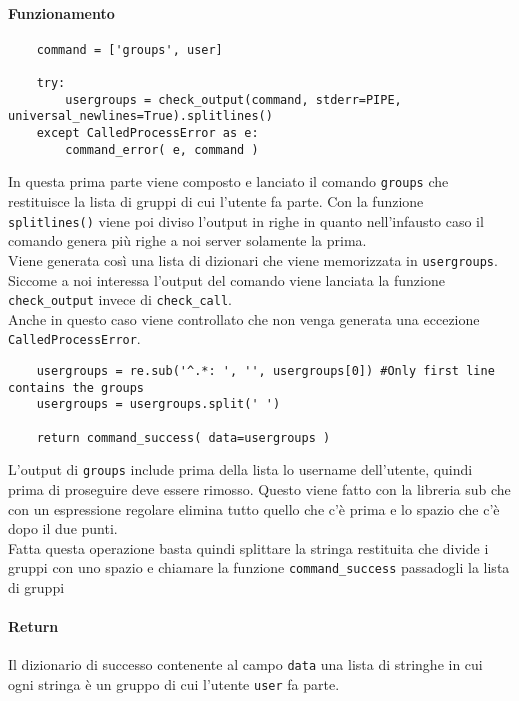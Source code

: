 \documentclass[11pt]{article}
\begin{document}
\paragraph{Funzionamento}
\begin{lstlisting}
    command = ['groups', user]
    
    try:
        usergroups = check_output(command, stderr=PIPE, universal_newlines=True).splitlines()
    except CalledProcessError as e:
        command_error( e, command )
\end{lstlisting}
In questa prima parte viene composto e lanciato il comando \texttt{groups} che restituisce la lista di gruppi
di cui l'utente fa parte. Con la funzione \texttt{splitlines()} viene poi diviso l'output in righe in quanto
nell'infausto caso il comando genera più righe a noi server solamente la prima.\\
Viene generata così una lista di dizionari che viene memorizzata in \texttt{usergroups}.\\
Siccome a noi interessa l'output del comando viene lanciata la funzione \texttt{check\_output} invece di \texttt{check\_call}.\\
Anche in questo caso viene controllato che non venga generata una eccezione \texttt{CalledProcessError}.
\begin{lstlisting}
    usergroups = re.sub('^.*: ', '', usergroups[0]) #Only first line contains the groups
    usergroups = usergroups.split(' ')

    return command_success( data=usergroups )
\end{lstlisting}
L'output di \texttt{groups} include prima della lista lo username dell'utente, quindi prima di proseguire
deve essere rimosso. Questo viene fatto con la libreria sub che con un espressione regolare elimina
tutto quello che c'è prima e lo spazio che c'è dopo il due punti.\\
Fatta questa operazione basta quindi splittare la stringa restituita che divide i gruppi con uno spazio
e chiamare la funzione \texttt{command\_success} passadogli la lista di gruppi
\paragraph{Return}
Il dizionario di successo contenente al campo \texttt{data} una lista di stringhe in cui ogni stringa è un gruppo
di cui l'utente \texttt{user} fa parte.
\end{document}
